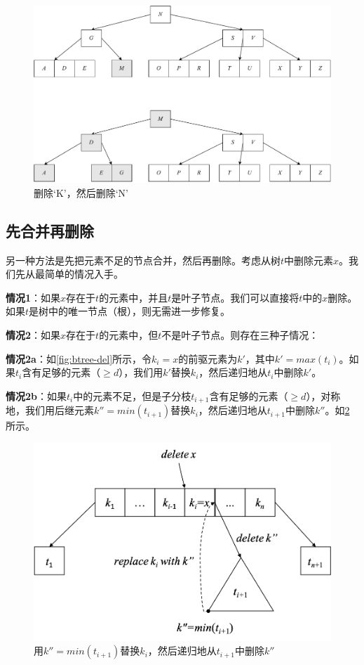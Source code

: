 \documentclass[b5paper]{ctexart}
\begin{document}
\begin{figure}[htbp]
  \centering
  \includegraphics[scale=0.33]{img/btree-del-KN}
  \caption{删除`K'，然后删除`N'}
  \label{fig:btree-del-KN}
\end{figure}

\subsection{先合并再删除}

另一种方法是先把元素不足的节点合并，然后再删除。考虑从树$t$中删除元素$x$。我们先从最简单的情况入手。

\textbf{情况1}：如果$x$存在于$t$的元素中，并且$t$是叶子节点。我们可以直接将$t$中的$x$删除。如果$t$是树中的唯一节点（根），则无需进一步修复。

\textbf{情况2}：如果$x$存在于$t$的元素中，但$t$不是叶子节点。则存在三种子情况：

\textbf{情况2a}：如\cref{fig:btree-del}所示，令$k_i = x$的前驱元素为$k'$，其中$k' = max(t_i)$。如果$t_i$含有足够的元素（$\geq d$），我们用$k'$替换$k_i$，然后递归地从$t_i$中删除$k'$。

\textbf{情况2b}：如果$t_i$中的元素不足，但是子分枝$t_{i+1}$含有足够的元素（$\geq d$），对称地，我们用后继元素$k'' = min(t_{i+1})$替换$k_i$，然后递归地从$t_{i+1}$中删除$k''$。如\cref{fig:btree-del-case2b}所示。

\begin{figure}[htbp]
  \centering
  \includegraphics[scale=0.5]{img/btree-del-case2b}
  \caption{用$k'' = min(t_{i+1})$替换$k_i$，然后递归地从$t_{i+1}$中删除$k''$}
  \label{fig:btree-del-case2b}
\end{figure}
\end{document}
